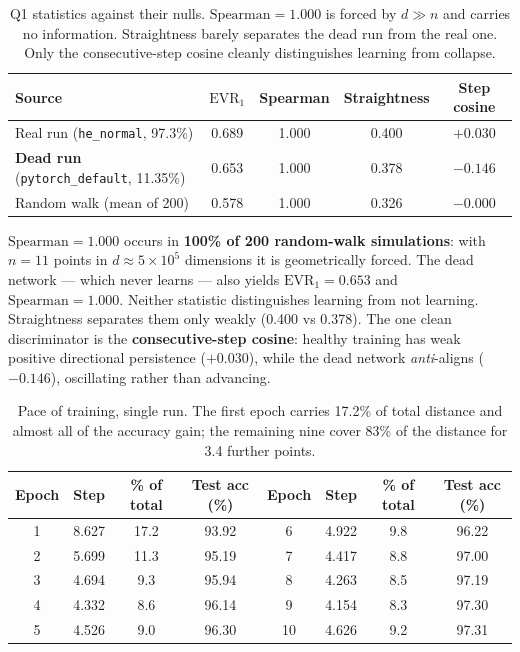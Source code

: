 \documentclass[11pt]{article}
\begin{document}
\begin{table}[htbp]\centering
\caption{Q1 statistics against their nulls. $\mathrm{Spearman}=1.000$ is forced by $d\gg n$ and
carries no information. Straightness barely separates the dead run from the real one. Only the
consecutive-step cosine cleanly distinguishes learning from collapse.}
\label{tab:q1null}
\begin{tabular}{lcccc}
\toprule
Source & $\mathrm{EVR}_1$ & Spearman & Straightness & Step cosine \\
\midrule
Real run (\texttt{he\_normal}, 97.3\%)     & 0.689 & 1.000 & 0.400 & $+0.030$ \\
\textbf{Dead run} (\texttt{pytorch\_default}, 11.35\%) & 0.653 & 1.000 & 0.378 & $\mathbf{-0.146}$ \\
Random walk (mean of 200)                  & 0.578 & 1.000 & 0.326 & $-0.000$ \\
\bottomrule
\end{tabular}
\end{table}

$\mathrm{Spearman} = 1.000$ occurs in \textbf{100\% of 200 random-walk simulations}: with $n=11$
points in $d\approx5\times10^5$ dimensions it is geometrically forced. The dead network --- which
never learns --- also yields $\mathrm{EVR}_1 = 0.653$ and $\mathrm{Spearman} = 1.000$. Neither
statistic distinguishes learning from not learning. Straightness separates them only weakly
(0.400 vs 0.378). The one clean discriminator is the \textbf{consecutive-step cosine}: healthy
training has weak positive directional persistence ($+0.030$), while the dead network
\emph{anti}-aligns ($-0.146$), oscillating rather than advancing.

\begin{table}[htbp]\centering
\caption{Pace of training, single run. The first epoch carries 17.2\% of total distance and
almost all of the accuracy gain; the remaining nine cover 83\% of the distance for 3.4 further
points.}
\label{tab:pace}
\begin{tabular}{cccc|cccc}
\toprule
Epoch & Step & \% of total & Test acc (\%) & Epoch & Step & \% of total & Test acc (\%) \\
\midrule
1 & 8.627 & 17.2 & 93.92 & 6  & 4.922 & 9.8 & 96.22 \\
2 & 5.699 & 11.3 & 95.19 & 7  & 4.417 & 8.8 & 97.00 \\
3 & 4.694 &  9.3 & 95.94 & 8  & 4.263 & 8.5 & 97.19 \\
4 & 4.332 &  8.6 & 96.14 & 9  & 4.154 & 8.3 & 97.30 \\
5 & 4.526 &  9.0 & 96.30 & 10 & 4.626 & 9.2 & 97.31 \\
\bottomrule
\end{tabular}
\end{table}
\end{document}
